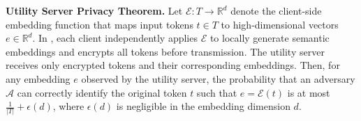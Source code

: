 

\textbf{Utility Server Privacy Theorem.}  
Let \(\mathcal{E}: T \to \mathbb{R}^d\) denote the client-side embedding function that maps input tokens \(t \in T\) to high-dimensional vectors \(e \in \mathbb{R}^d\). In \Sys, each client independently applies \(\mathcal{E}\) to locally generate semantic embeddings and encrypts all tokens before transmission. The utility server receives only encrypted tokens and their corresponding embeddings. Then, for any embedding \(e\) observed by the utility server, the probability that an adversary \(\mathcal{A}\) can correctly identify the original token \(t\) such that \(e = \mathcal{E}(t)\) is at most \(\frac{1}{|T|} + \epsilon(d)\), where \(\epsilon(d)\) is negligible in the embedding dimension \(d\).

